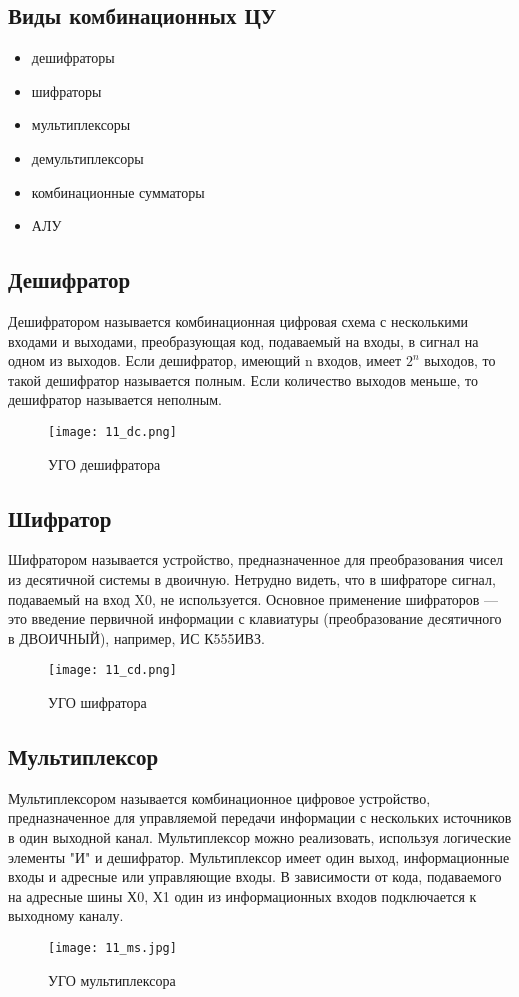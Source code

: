 \subsection*{Виды комбинационных ЦУ}
\begin{itemize}
\item дешифраторы
\item шифраторы
\item мультиплексоры
\item демультиплексоры
\item комбинационные сумматоры
\item АЛУ
\end{itemize}


\subsection*{Дешифратор}

Дешифратором называется комбинационная цифровая схема с несколькими входами и выходами, преобразующая код, подаваемый на входы, в сигнал на одном из выходов. Если дешифратор, имеющий n входов, имеет $2^{n}$ выходов, то такой дешифратор называется полным. Если количество выходов меньше, то дешифратор называется неполным.
\begin{figure}[H]
\centering
\texttt{[image: 11\_dc.png]}
\caption{УГО дешифратора}
\label{fig:11_dc}
\end{figure}

\subsection*{Шифратор}

Шифратором называется устройство, предназначенное для преобразования чисел из десятичной системы в двоичную. Нетрудно видеть, что в шифраторе сигнал, подаваемый на вход X0, не используется. Основное применение шифраторов --- это введение первичной информации с клавиатуры (преобразование десятичного в ДВОИЧНЫЙ), например, ИС К555ИВЗ.
\begin{figure}[H]
\centering
\texttt{[image: 11\_cd.png]}
\caption{УГО шифратора}
\label{fig:11_cd}
\end{figure}

\subsection*{Мультиплексор}

Мультиплексором называется комбинационное цифровое устройство, предназначенное для управляемой передачи информации с нескольких источников в один выходной канал. Мультиплексор можно реализовать, используя логические элементы "И" и дешифратор. Мультиплексор имеет один выход, информационные входы и адресные или управляющие входы. В зависимости от кода, подаваемого на адресные шины Х0, Х1 один из информационных входов подключается к выходному каналу.
\begin{figure}[H]
\centering
\texttt{[image: 11\_ms.jpg]}
\caption{УГО мультиплексора}
\label{fig:11_ms}
\end{figure}

